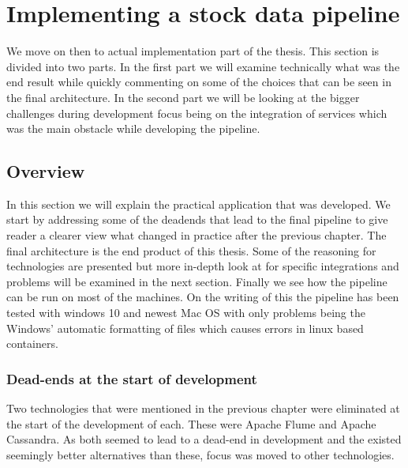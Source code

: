 \chapter{Implementing a stock data pipeline}
\label{chapter:implementation}



We move on then to actual implementation part of the thesis. 
This section is divided into two parts.
In the first part we will examine technically what was the end result while quickly commenting on some of the choices that can be seen in the final architecture.
In the second part we will be looking at the bigger challenges during development focus being on the integration of services which was the main obstacle while developing the pipeline.

\section{Overview}

In this section we will explain the practical application that was developed.
We start by addressing some of the deadends that lead to the final pipeline to give reader a clearer view what changed in practice after the previous chapter.
The final architecture is the end product of this thesis.
Some of the reasoning for technologies are presented but more in-depth look at for specific integrations and problems will be examined in the next section.
Finally we see how the pipeline can be run on most of the machines.
On the writing of this the pipeline has been tested with windows 10 and newest Mac OS with only problems being the Windows' automatic formatting of files which causes errors in linux based containers.


\subsection{Dead-ends at the start of development}

Two technologies that were mentioned in the previous chapter were eliminated at the start of the development of each.
These were Apache Flume and Apache Cassandra.
As both seemed to lead to a dead-end in development and the existed seemingly better alternatives than these, focus was moved to other technologies.

